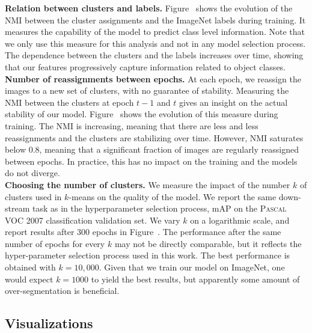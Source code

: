 \noindent\textbf{Relation between clusters and labels.}
Figure~ shows the evolution of the NMI between the cluster assignments and the ImageNet labels during training.
It measures the capability of the model to predict class level information.
Note that we only use this measure for this analysis and not in any model selection process.
The dependence between the clusters and the labels increases over time, showing that our features progressively capture information
related to object classes.
\\

\noindent\textbf{Number of reassignments between epochs.}
At each epoch, we reassign the images to a new set of clusters, with no guarantee of stability.
Measuring the NMI between the clusters at epoch $t-1$ and $t$ gives an insight on the actual
stability of our model.
Figure~ shows the evolution of this measure during training.
The NMI is increasing, meaning that there are less and less reassignments and the clusters are stabilizing over time.
However, NMI saturates below $0.8$, meaning that a significant fraction of images are regularly reassigned between epochs.
In practice, this has no impact on the training and the models do not diverge.
\\

\noindent\textbf{Choosing the number of clusters.}
We measure the impact of the number $k$ of clusters used in $k$-means on the quality of the model.
We report the same down-stream task as in the hyperparameter selection process, \ie mAP on the \textsc{Pascal} VOC 2007 classification validation set.
We vary $k$ on a logarithmic scale, and report results after $300$ epochs in Figure~.
The performance after the same number of epochs for every $k$ may not be directly comparable, but it reflects the hyper-parameter selection process
used in this work.
The best performance is obtained with $k=10,000$.
Given that we train our model on ImageNet, one would expect $k = 1000$ to yield the best results, but apparently some amount of over-segmentation is beneficial.


\subsection{Visualizations}
\label{sec:viz}

